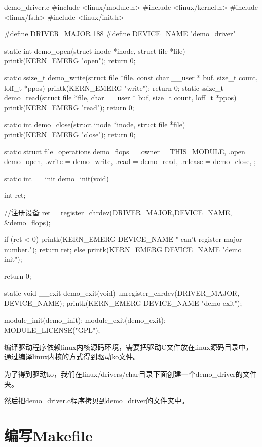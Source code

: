 \documentclass[lang=cn,newtx,10pt,scheme=chinese]{elegantbook}
\begin{document}
\begin{mycode}{demo\_driver.c}
#include <linux/module.h>
#include <linux/kernel.h>
#include <linux/fs.h>
#include <linux/init.h>

#define    DRIVER_MAJOR     188
#define    DEVICE_NAME     "demo_driver"

static int demo_open(struct inode *inode, struct file *file)
{    
    printk(KERN_EMERG "open\n");
    return 0;
}

static ssize_t demo_write(struct file *file, const char __user * buf, size_t count, loff_t *ppos)
{
    printk(KERN_EMERG "write\n");
    return 0;
}
static ssize_t demo_read(struct file *file,  char __user * buf, size_t count, loff_t *ppos)
{
    printk(KERN_EMERG "read\n");  
    return 0;
}

static int demo_close(struct inode *inode, struct file *file)
{
    printk(KERN_EMERG "close\n");
    return 0;
}

static struct file_operations demo_flops = 
{
    .owner  =   THIS_MODULE,
    .open   =   demo_open,     
    .write  =   demo_write,
    .read     =      demo_read,
    .release =  demo_close,
};

static int __init demo_init(void)
{
    int ret;
         
    //注册设备
    ret = register_chrdev(DRIVER_MAJOR,DEVICE_NAME, &demo_flops);

    if (ret < 0) 
    {
      printk(KERN_EMERG DEVICE_NAME " can't register major number.\n");
      return ret;
    }
    else
    {
        printk(KERN_EMERG DEVICE_NAME "demo init\n");
    }

    return 0;
}

static void __exit demo_exit(void)
{
    unregister_chrdev(DRIVER_MAJOR, DEVICE_NAME);
    printk(KERN_EMERG DEVICE_NAME "demo exit\n");
}

module_init(demo_init);
module_exit(demo_exit);
MODULE_LICENSE("GPL");
\end{mycode}

编译驱动程序依赖linux内核源码环境，需要把驱动C文件放在linux源码目录中，通过编译linux内核的方式得到驱动ko文件。

为了得到驱动ko，我们在linux/drivers/char目录下面创建一个demo\_driver的文件夹。

然后把demo\_driver.c程序拷贝到demo\_driver的文件夹中。

\section{编写Makefile}
\end{document}
